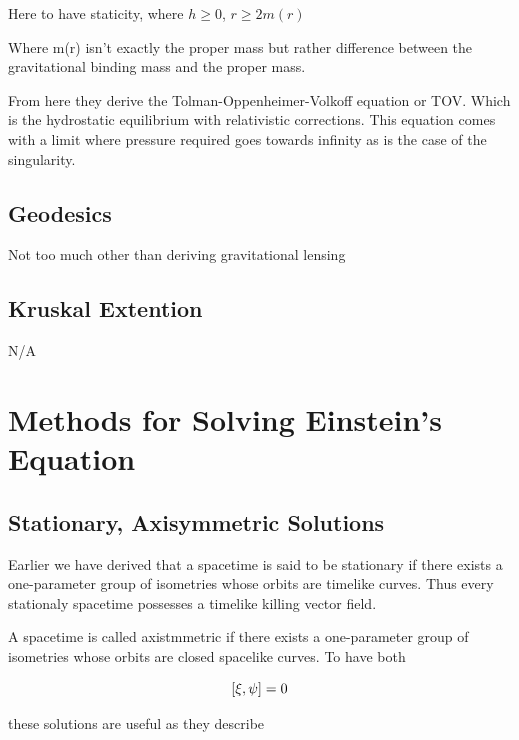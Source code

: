   Here to have staticity, where $h \geq 0$, $r \geq 2m(r)$

Where m(r) isn't exactly the proper mass but rather difference between the gravitational binding mass and the proper mass.


From here they derive the Tolman-Oppenheimer-Volkoff equation or TOV. Which is the hydrostatic equilibrium with relativistic corrections. This equation comes with a limit where pressure required goes towards infinity as is the case of the singularity.

\subsection{Geodesics}


Not too much other than deriving gravitational lensing

\subsection{Kruskal Extention}

N/A


\section{Methods for Solving Einstein's Equation}

\subsection{Stationary, Axisymmetric Solutions}

Earlier we have derived that a spacetime is said to be stationary if there exists a one-parameter group of isometries whose orbits are timelike curves. Thus every stationaly spacetime possesses a timelike killing vector field.

A spacetime is called axistmmetric if there exists a one-parameter group of isometries whose orbits are closed spacelike curves. To have both

\[
\comm{\xi}{\psi} = 0
  \]

  these solutions are useful as they describe
